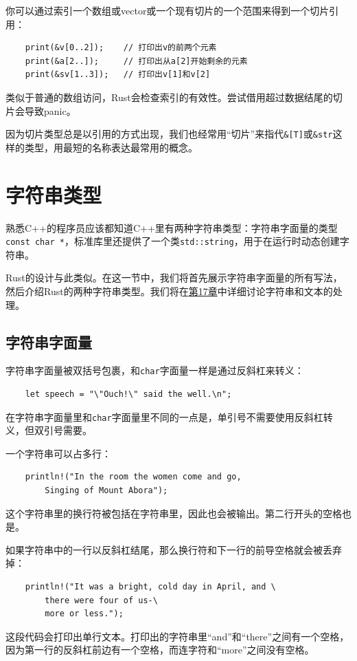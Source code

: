 你可以通过索引一个数组或vector或一个现有切片的一个范围来得到一个切片引用：
\begin{verbatim}
    print(&v[0..2]);    // 打印出v的前两个元素
    print(&a[2..]);     // 打印出从a[2]开始剩余的元素
    print(&sv[1..3]);   // 打印出v[1]和v[2]
\end{verbatim}

类似于普通的数组访问，Rust会检查索引的有效性。尝试借用超过数据结尾的切片会导致panic。

因为切片类型总是以引用的方式出现，我们也经常用“切片”来指代\texttt{\&[T]}或\texttt{\&str}这样的类型，用最短的名称表达最常用的概念。

\section{字符串类型}

熟悉C++的程序员应该都知道C++里有两种字符串类型：字符串字面量的类型\texttt{const char *}，标准库里还提供了一个类\texttt{std::string}，用于在运行时动态创建字符串。

Rust的设计与此类似。在这一节中，我们将首先展示字符串字面量的所有写法，然后介绍Rust的两种字符串类型。我们将在\hyperref[ch17]{第17章}中详细讨论字符串和文本的处理。

\subsection{字符串字面量}\label{StrLiteral}

字符串字面量被双括号包裹，和\texttt{char}字面量一样是通过反斜杠来转义：
\begin{verbatim}
    let speech = "\"Ouch!\" said the well.\n";
\end{verbatim}

在字符串字面量里和\texttt{char}字面量里不同的一点是，单引号不需要使用反斜杠转义，但双引号需要。

一个字符串可以占多行：
\begin{verbatim}
    println!("In the room the women come and go,
        Singing of Mount Abora");
\end{verbatim}
这个字符串里的换行符被包括在字符串里，因此也会被输出。第二行开头的空格也是。


如果字符串中的一行以反斜杠结尾，那么换行符和下一行的前导空格就会被丢弃掉：
\begin{verbatim}
    println!("It was a bright, cold day in April, and \
        there were four of us-\
        more or less.");
\end{verbatim}
这段代码会打印出单行文本。打印出的字符串里“and”和“there”之间有一个空格，因为第一行的反斜杠前边有一个空格，而连字符和“more”之间没有空格。

